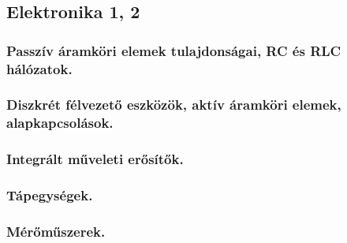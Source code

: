 \subsection{Elektronika 1, 2}
\subsubsection{Passzív áramköri elemek tulajdonságai, RC és RLC hálózatok.}

\subsubsection{Diszkrét félvezető eszközök, aktív áramköri elemek, alapkapcsolások.}

\subsubsection{Integrált műveleti erősítők.}

\subsubsection{Tápegységek.}

\subsubsection{Mérőműszerek.}
